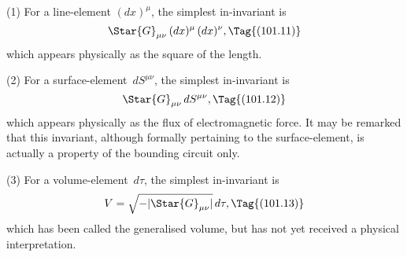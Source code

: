 \documentclass[12pt]{book}
\begin{document}
(1) For a line-element $(dx)^{\mu}$, the simplest in-invariant is
\[
\Star{G}_{\mu\nu}\, (dx)^{\mu}\, (dx)^{\nu},
\Tag{(101.11)}
\]
which appears physically as the square of the length.

(2) For a surface-element~$dS^{\mu\nu}$, the simplest in-invariant is
%
\[
\Star{G}_{\mu\nu}\, dS^{\mu\nu},
\Tag{(101.12)}
\]
which appears physically as the flux of electromagnetic force. It may be
%
remarked that this invariant, although formally pertaining to the surface-element,
is actually a property of the bounding circuit only.

(3) For a volume-element~$d\tau$, the simplest in-invariant is
\[
V = \sqrt{-|\Star{G}_{\mu\nu}|}\, d\tau,
\Tag{(101.13)}
\]
which has been called the generalised volume, but has not yet received a
physical interpretation.
\end{document}
